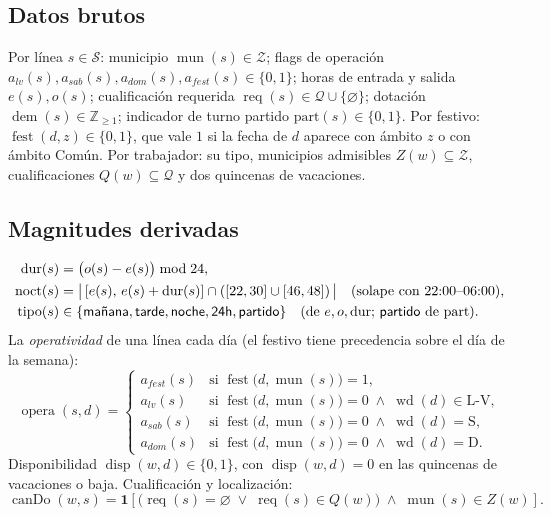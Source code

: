 \documentclass[11pt,a4paper]{article}
\newcommand{\indic}[1]{\mathbf{1}\!\left[#1\right]}
\newcommand{\opera}{\operatorname{opera}}
\newcommand{\dur}{\operatorname{dur}}
\newcommand{\noct}{\operatorname{noct}}
\newcommand{\tipo}{\operatorname{tipo}}
\newcommand{\reqq}{\operatorname{req}}
\newcommand{\dem}{\operatorname{dem}}
\newcommand{\munf}{\operatorname{mun}}
\newcommand{\fest}{\operatorname{fest}}
\newcommand{\avail}{\operatorname{disp}}
\newcommand{\canDo}{\operatorname{canDo}}
\newcommand{\wkd}{\operatorname{wd}}
\newcommand{\Sk}{\mathcal{S}}
\newcommand{\Zk}{\mathcal{Z}}
\newcommand{\Qk}{\mathcal{Q}}
\newcommand{\Lv}{\mathrm{L\text{-}V}}
\theoremstyle{definition}
\begin{document}
\subsection{Datos brutos}
Por línea $s\in\Sk$: municipio $\munf(s)\in\Zk$; flags de operación
$a_{lv}(s),a_{sab}(s),a_{dom}(s),a_{fest}(s)\in\{0,1\}$; horas de entrada y salida
$e(s),o(s)$; cualificación requerida $\reqq(s)\in\Qk\cup\{\varnothing\}$; dotación
$\dem(s)\in\mathbb{Z}_{\ge 1}$; indicador de turno partido $\mathrm{part}(s)\in\{0,1\}$.
Por festivo: $\fest(d,z)\in\{0,1\}$, que vale $1$ si la fecha de $d$ aparece con ámbito
$z$ o con ámbito \textsf{Común}.
Por trabajador: su tipo, municipios admisibles $Z(w)\subseteq\Zk$, cualificaciones
$Q(w)\subseteq\Qk$ y dos quincenas de vacaciones.

\subsection{Magnitudes derivadas}
\begin{align}
  \dur(s) &= \big(o(s)-e(s)\big)\bmod 24, \\
  \noct(s) &= \big|\,[e(s),\,e(s)+\dur(s)]\cap([22,30]\cup[46,48])\,\big|
    \quad\text{(solape con 22:00--06:00)},\\
  \tipo(s) &\in\{\textsf{mañana},\textsf{tarde},\textsf{noche},\textsf{24h},\textsf{partido}\}
    \quad\text{(de $e,o,\dur$; \textsf{partido} de $\mathrm{part}$).}
\end{align}
La \emph{operatividad} de una línea cada día (el festivo tiene precedencia sobre el día de
la semana):
\begin{equation}\label{eq:opera}
  \opera(s,d)=
  \begin{cases}
    a_{fest}(s) & \text{si } \fest\big(d,\munf(s)\big)=1,\\[2pt]
    a_{lv}(s)   & \text{si } \fest\big(d,\munf(s)\big)=0 \;\wedge\; \wkd(d)\in\Lv,\\[2pt]
    a_{sab}(s)  & \text{si } \fest\big(d,\munf(s)\big)=0 \;\wedge\; \wkd(d)=\mathrm{S},\\[2pt]
    a_{dom}(s)  & \text{si } \fest\big(d,\munf(s)\big)=0 \;\wedge\; \wkd(d)=\mathrm{D}.
  \end{cases}
\end{equation}
Disponibilidad $\avail(w,d)\in\{0,1\}$, con $\avail(w,d)=0$ en las quincenas de vacaciones
o baja. Cualificación y localización:
\begin{equation}\label{eq:cando}
  \canDo(w,s)=\indic{\big(\reqq(s)=\varnothing \;\vee\; \reqq(s)\in Q(w)\big)\;\wedge\;\munf(s)\in Z(w)}.
\end{equation}
\end{document}
